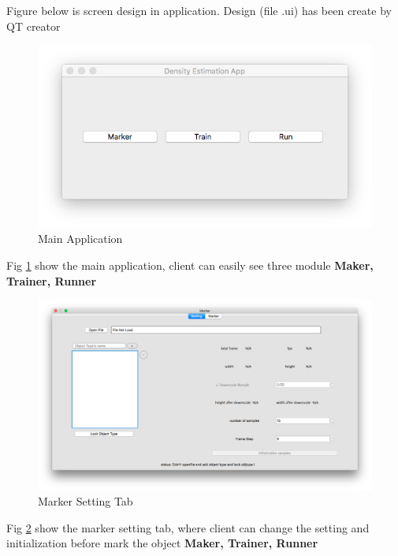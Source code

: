 Figure below is screen design in application. Design (file .ui) has been create by QT creator

\begin{center}
  \begin{figure}[H]
      \includegraphics[width=\textwidth]{Chapters/Fig/Appllication}
      \caption{Main Application}
      \label{fig:mainapp}
    \end{figure}

  Fig \ref{fig:mainapp} show the main application, client can easily see three module \textbf{Maker, Trainer, Runner}

    \begin{figure}[H]
      \includegraphics[width=\textwidth]{Chapters/Fig/marker-setting}
      \caption{Marker Setting Tab}
      \label{fig:marker-setting}
    \end{figure}

  Fig \ref{fig:marker-setting} show the marker setting tab, where client can change the setting and initialization before mark the object \textbf{Maker, Trainer, Runner}\\


\end{center}
